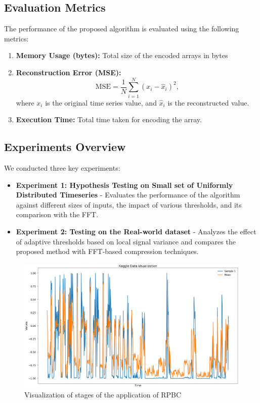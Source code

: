\documentclass[onecolumn,conference]{IEEEtran}
\begin{document}
\subsection{Evaluation Metrics}
The performance of the proposed algorithm is evaluated using the following metrics:
\begin{enumerate}
    \item \textbf{Memory Usage (bytes):} Total size of the encoded arrays in bytes
    \item \textbf{Reconstruction Error (MSE):}
    \[
    \text{MSE} = \frac{1}{N} \sum_{i=1}^{N} (x_i - \hat{x}_i)^2,
    \]
    where \( x_i \) is the original time series value, and \( \hat{x}_i \) is the reconstructed value.
    \item \textbf{Execution Time:} Total time taken for encoding the array.
\end{enumerate}

\subsection{Experiments Overview}
We conducted three key experiments:
\begin{itemize}
    \item \textbf{Experiment 1: Hypothesis Testing on Small set of Uniformly Distributed Timeseries} - Evaluates the performance of the algorithm against different sizes of inputs, the impact of various thresholds, and its comparison with the FFT.
    \item \textbf{Experiment 2: Testing on the Real-world dataset} - Analyzes the effect of adaptive thresholds based on local signal variance and compares the proposed method with FFT-based compression techniques.
\end{itemize}
\begin{figure}[!h]
    \centering
    \includegraphics[width=0.7\linewidth, height=0.7\linewidth, keepaspectratio]{images/Experiment 2 Part a.png}
    \caption{Visualization of stages of the application of RPBC}
    \label{fig:A Sample Visualization of the Human Activity Recoginition Dataset }
\end{figure}
\end{document}
